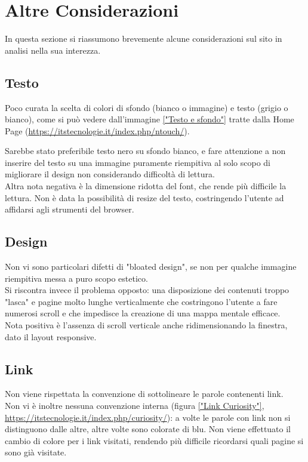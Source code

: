 \section{Altre Considerazioni}
In questa sezione si riassumono brevemente alcune considerazioni sul sito in analisi nella sua interezza.
\subsection{Testo}
Poco curata la scelta di colori di sfondo (bianco o immagine) e testo (grigio o bianco), come si può vedere dall'immagine \ref{"Testo e sfondo"} tratte dalla Home Page (\url{https://itstecnologie.it/index.php/ntouch/}).

Sarebbe stato preferibile testo nero su sfondo bianco, e fare attenzione a non inserire del testo su una immagine puramente riempitiva al solo scopo di migliorare il design non considerando difficoltà di lettura.\\ 
Altra nota negativa è la dimensione ridotta del font, che rende più difficile la lettura. Non è data la possibilità di resize del testo, costringendo l'utente ad affidarsi agli strumenti del browser.

\subsection{Design}
Non vi sono particolari difetti di "bloated design", se non per qualche immagine riempitiva messa a puro scopo estetico. \\ Si riscontra invece il problema opposto: una disposizione dei contenuti troppo "lasca" e pagine molto lunghe verticalmente che costringono l'utente a fare numerosi scroll e che impedisce la creazione di una mappa mentale efficace. \\
Nota positiva è l'assenza di scroll verticale anche ridimensionando la finestra, dato il layout responsive.

\subsection{Link}
Non viene rispettata la convenzione di sottolineare le parole contenenti link. \\ Non vi è inoltre nessuna convenzione interna (figura \ref{"Link Curiosity"}, \url{https://itstecnologie.it/index.php/curiosity/}): a volte le parole con link non si distinguono dalle altre, altre volte sono colorate di blu. Non viene effettuato il cambio di colore per i link visitati, rendendo più difficile ricordarsi quali pagine si sono già visitate.


